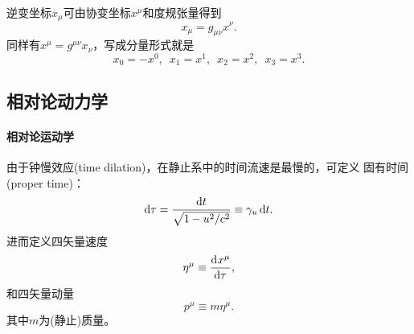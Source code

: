\begin{corollary}
    逆变坐标$x_\mu$可由协变坐标$x^\mu$和度规张量得到
    \begin{equation}
        x_\mu=g_{\mu\nu}x^\nu.
    \end{equation}
    同样有$x^\mu=g^{\mu\nu}x_\nu$，写成分量形式就是
    \[
        x_0=-x^0,\enspace x_1=x^1,\enspace x_2=x^2,\enspace x_3=x^3.
    \]
\end{corollary}

\subsection{相对论动力学}

\paragraph{相对论运动学}

由于钟慢效应(time dilation)，在静止系中的时间流速是最慢的，可定义
固有时间(proper time)：
\[
    \mathop{}\!\mathrm{d}\tau=\frac{\mathop{}\!\mathrm{d} t}{\sqrt{1-u^2/c^2}}\equiv\gamma_u\mathop{}\!\mathrm{d} t.
\]
进而定义四矢量速度
\begin{equation}
    \eta^\mu\equiv\frac{\mathrm{d}^{{}}x^\mu}{\mathrm{d}{\tau}^{{}}},
\end{equation}
和四矢量动量
\begin{equation}
    p^\mu\equiv m\eta^\mu.
\end{equation}
其中$m$为(静止)质量。

